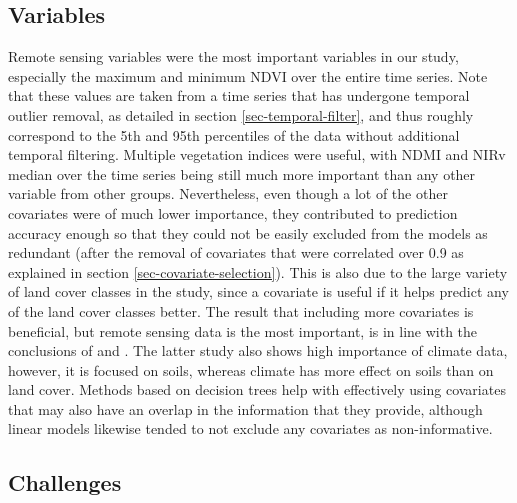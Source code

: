 \documentclass[review,authoryear,3p]{elsarticle}
\begin{document}
\subsection{Variables}

Remote sensing variables were the most important variables in our study, especially the maximum and minimum \gls{NDVI} over the entire time series.
Note that these values are taken from a time series that has undergone temporal outlier removal, as detailed in section \ref{sec-temporal-filter}, and thus roughly correspond to the 5th and 95th percentiles of the data without additional temporal filtering.
Multiple vegetation indices were useful, with \gls{NDMI} and \gls{NIRv} median over the time series being still much more important than any other variable from other groups.
Nevertheless, even though a lot of the other covariates were of much lower importance, they  contributed to prediction accuracy enough so that they could not be easily excluded from the models as redundant (after the removal of covariates that were correlated over 0.9 as explained in section \ref{sec-covariate-selection}).
This is also due to the large variety of land cover classes in the study, since a covariate is useful if it helps predict any of the land cover classes better.
The result that including more covariates is beneficial, but remote sensing data is the most important, is in line with the conclusions of \citet{li_monitoring_2018} and \citet{hengl_soilgrids250m_2017}.
The latter study also shows high importance of climate data, however, it is focused on soils, whereas climate has more effect on soils than on land cover.
Methods based on decision trees help with effectively using covariates that may also have an overlap in the information that they provide, although linear models likewise tended to not exclude any covariates as non-informative.

\subsection{Challenges}
\end{document}
